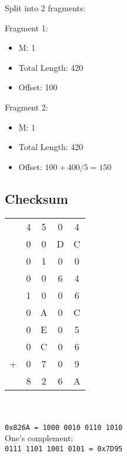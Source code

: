 \documentclass{article}
\begin{document}
Split into 2 fragments:

Fragment 1:
\begin{itemize}
    \item M: 1
    \item Total Length: 420
    \item Offset: 100
\end{itemize}


Fragment 2:
\begin{itemize}
    \item M: 1
    \item Total Length: 420
    \item Offset: \(100 + 400/5 = 150\)
\end{itemize}

\subsection*{Checksum}
\begin{tabular}{ccccc}
      & 4 & 5 & 0 & 4 \\
      & 0 & 0 & D & C \\
      & 0 & 1 & 0 & 0 \\
      & 0 & 0 & 6 & 4 \\
      & 1 & 0 & 0 & 6 \\
      & 0 & A & 0 & C \\
      & 0 & E & 0 & 5 \\
      & 0 & C & 0 & 6 \\
    + & 0 & 7 & 0 & 9 \\
    \midrule
      & 8 & 2 & 6 & A
\end{tabular}
\\\\
\verb|0x826A = 1000 0010 0110 1010|\\
One's complement:\\
\verb|0111 1101 1001 0101 = 0x7D95|\\
\end{document}
